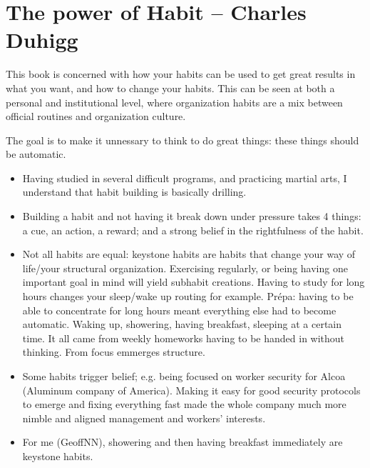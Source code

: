 \section{The power of Habit -- Charles Duhigg}

This book is concerned with how your habits can be used to get great results in what you want, and how to change your habits. This can be seen at both a personal and institutional level, where organization habits are a mix between official routines and organization culture.

The goal is to make it unnessary to think to do great things: these things should be automatic.

\begin{itemize}
    \item Having studied in several difficult programs, and practicing martial arts, I understand that habit building is basically drilling. 
    \item Building a habit and not having it break down under pressure takes 4 things: a cue, an action, a reward; and a strong belief in the rightfulness of the habit.
    \item Not all habits are equal: keystone habits are habits that change your way of life/your structural organization. Exercising regularly, or being having one important goal in mind will yield subhabit creations. Having to study for long hours changes your sleep/wake up routing for example. Prépa: having to be able to concentrate for long hours meant everything else had to become automatic. Waking up, showering, having breakfast, sleeping at a certain time. It all came from weekly homeworks having to be handed in without thinking. From focus emmerges structure.
    \item Some habits trigger belief; e.g. being focused on worker security for Alcoa (Aluminum company of America). Making it easy for good security protocols to emerge and fixing everything fast made the whole company much more nimble and aligned management and workers' interests.
    \item For me (GeoffNN), showering and then having breakfast immediately are keystone habits. 
\end{itemize}